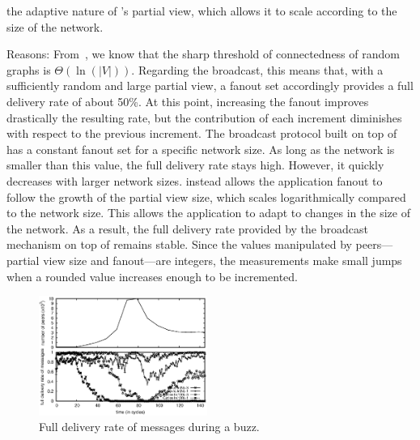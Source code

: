 \begin{asparadesc}
  the adaptive nature of \SPRAY's partial view, which allows it to
  scale according to the size of the network.
\item [Reasons:] From~\cite{erdos1959random}, we know that the sharp
  threshold of connectedness of random graphs is
  $\Theta(\ln(|V|))$. Regarding the broadcast, this means that, with a
  sufficiently random and large partial view, a fanout set accordingly
  provides a full delivery rate of about 50\%. At this point,
  increasing the fanout improves drastically the resulting rate, but
  the contribution of each increment diminishes with respect to the
  previous increment. The broadcast protocol built on top of \CYCLON
  has a constant fanout set for a specific network size. As long as
  the network is smaller than this value, the full delivery rate stays
  high. However, it quickly decreases with larger network sizes.
  \SPRAY instead allows the application fanout to follow the growth of
  the partial view size, which scales logarithmically compared to the
  network size. This allows the application to adapt to changes in the
  size of the network. As a result, the full delivery rate provided by
  the broadcast mechanism on top of \SPRAY remains stable. Since the
  values manipulated by peers---partial view size and fanout---are
  integers, the measurements make small jumps when a rounded value
  increases enough to be incremented.
\end{asparadesc}




\begin{figure}
  \begin{center}
    \includegraphics[width=0.49\textwidth]{img/peak.eps}
    \caption{\label{fig:peak}Full delivery rate of messages during a buzz.}
  \end{center}
\end{figure}

